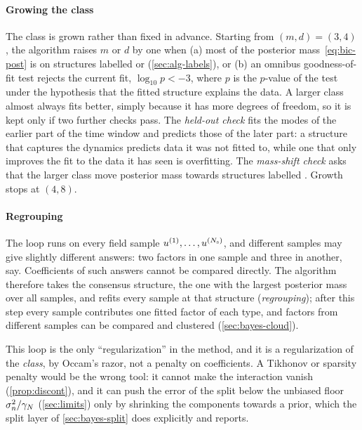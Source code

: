\paragraph{Growing the class} The class is grown rather than fixed in advance. Starting from $(m,d)=(3,4)$, the
algorithm raises $m$ or $d$ by one when (a) most of the posterior mass~\eqref{eq:bic-post} is on structures labelled
\MIS{} or \IDK{} (\cref{sec:alg-labels}), or (b) an omnibus goodness-of-fit test rejects the current fit,
$\log_{10}p<-3$, where $p$ is the $p$-value of the test under the hypothesis that the fitted structure explains the data.
A larger class almost always fits better, simply because it has more degrees of freedom, so it is kept only if two
further checks pass. The \emph{held-out check} fits the modes of the earlier part of the time window and predicts those
of the later part: a structure that captures the dynamics predicts data it was not fitted to, while one that
only improves the fit to the data it has seen is overfitting. The \emph{mass-shift check} asks that the larger class
move posterior mass towards structures labelled \FC. Growth stops at $(4,8)$.

\paragraph{Regrouping} The loop runs on every field sample $u^{(1)},\dots,u^{(N_{\mathrm s})}$, and different samples may give
slightly different answers: two factors in one sample and three in another, say. Coefficients of such answers cannot be
compared directly. The algorithm therefore takes the consensus structure, the one with the largest posterior mass over
all samples, and refits every sample at that structure (\emph{regrouping}); after this step every sample contributes one
fitted factor of each type, and factors from different samples can be compared and clustered (\cref{sec:bayes-cloud}).

This loop is the only ``regularization'' in the method, and it is a regularization of the
\emph{class}, by Occam's razor, not a penalty on coefficients. A Tikhonov or sparsity penalty would be
the wrong tool: it cannot make the interaction vanish (\cref{prop:discont}), and it can push the error of the split
below the unbiased floor $\sigma_{n}^2/\gamma_{N}$ (\cref{sec:limits}) only by shrinking the components towards a prior, which the
split layer of \cref{sec:bayes-split} does explicitly and reports.
